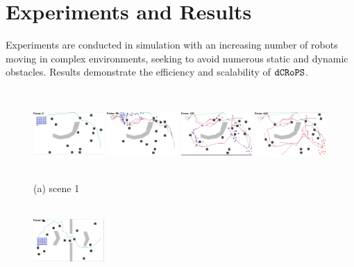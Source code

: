 \documentclass[letterpaper, 10pt, conference]{ieeeconf}
\newcommand{\Acronym}[1]{\ensuremath{{\small{\texttt{#1}}}}}
\newcommand{\Name}{\Acronym{dCRoPS}}
\begin{document}
\section{Experiments and Results}
\label{sec:ExpResults}

Experiments are conducted in simulation with an increasing number of
robots moving in complex environments, seeking to avoid numerous
static and dynamic obstacles. Results demonstrate the efficiency and scalability
of $\Name$.


\begin{figure}
\centering
\includegraphics[width=0.24\textwidth,height=1.35in,frame]{figs/great_divide_1.png}
\includegraphics[width=0.24\textwidth,height=1.35in,frame]{figs/great_divide_2.png}
\includegraphics[width=0.24\textwidth,height=1.35in,frame]{figs/great_divide_3.png}
\includegraphics[width=0.24\textwidth,height=1.35in,frame]{figs/great_divide_4.png}\\[2mm]
(a) scene 1\\[2mm]
\includegraphics[width=0.24\textwidth,height=1.35in,frame]{figs/hurdles_1.png}

\end{figure}
\end{document}
